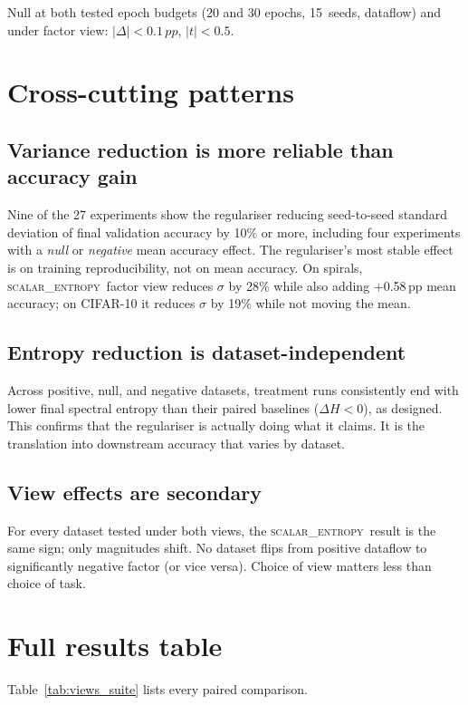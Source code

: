 \documentclass[11pt,a4paper]{article}
\newcommand{\pp}{\,pp\xspace}
\newcommand{\scalarH}{\textsc{scalar\_entropy}\xspace}
\begin{document}
Null at both tested epoch budgets (20 and 30 epochs, 15~seeds,
dataflow) and under factor view: $|\Delta|<0.1\pp$, $|t|<0.5$.

\section{Cross-cutting patterns}

\subsection{Variance reduction is more reliable than accuracy gain}

Nine of the 27 experiments show the regulariser reducing seed-to-seed
standard deviation of final validation accuracy by 10\% or more,
including four experiments with a \emph{null} or \emph{negative} mean
accuracy effect. The regulariser's most stable effect is on training
reproducibility, not on mean accuracy. On spirals, \scalarH\ factor view
reduces $\sigma$ by 28\% while also adding +0.58\pp{} mean accuracy; on
CIFAR-10 it reduces $\sigma$ by 19\% while not moving the mean.

\subsection{Entropy reduction is dataset-independent}

Across positive, null, and negative datasets, treatment runs consistently
end with lower final spectral entropy than their paired baselines
($\Delta H < 0$), as designed. This confirms that the regulariser is
actually doing what it claims. It is the translation into downstream
accuracy that varies by dataset.

\subsection{View effects are secondary}

For every dataset tested under both views, the \scalarH\ result is the
same sign; only magnitudes shift. No dataset flips from positive
dataflow to significantly negative factor (or vice versa). Choice of
view matters less than choice of task.

\section{Full results table}

Table~\ref{tab:views_suite} lists every paired comparison.
\end{document}
